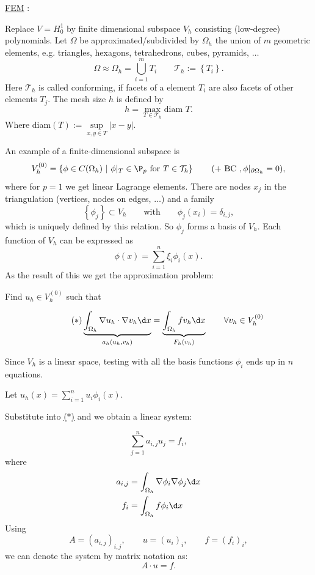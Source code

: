 \underline{FEM} :

Replace $V=H_{0}^{1}$ by finite dimensional subspace $V_{h}$ consisting (low-degree) polynomials.
Let $\Omega $ be approximated/subdivided by $\Omega _{h}$ the union of $m$ geometric elements, e.g. triangles, hexagons, tetrahedrons, cubes, pyramids, $\ldots $
\[
\Omega \approx \Omega _{h} = \bigcup_{i=1}^{m}T_{i} \qquad \mathcal{T}_{h} := \left\{ T_{i} \right\} 
.\] 
Here $\mathcal{T}_{h}$ is called conforming, if facets of a element $T_{i}$ are also facets of other elements $T_{j}$.
The mesh size $h$ is defined by
\[
h = \max\limits_{T \in\mathcal{T}_{h}} \text{diam } T
.\] 
Where diam$(T):=\underset{x,y \in T }{\sup} |x-y|$.

An example of a finite-dimensional subspace is
\[
	V_{h}^{(0)} = \left\{ \phi \in C(\Omega _{h})\ |\ \phi|_{T} \in \P_{p} \text{ for } T \in \mathcal{T}_{h} \right\} \qquad (+ \text{ BC }, \phi|_{\partial \Omega _{h}}=0)
,\] 
where for $p=1$ we get linear Lagrange elements.
There are nodes $x_{j}$ in the triangulation (vertices, nodes on edges, $\ldots $) and a family
\[
	\left\{ \phi_{j} \right\} \subset V_{h} \qquad \text{with}\qquad \phi_{j}(x_{i}) = \delta_{i,j}
,\] 
which is uniquely defined by this relation.
So $\phi_{j}$ forms a basis of $V_{h}$.
Each function of $V_{h}$ can be expressed as
\[
	\phi(x) = \sum_{i=1}^{n}{\xi _{i}\phi_{i}(x)}
.\] 
As the result of this we get the approximation problem:

Find $u_{h} \in V_{h}^{(0)}$ such that

\begin{equation}\label{eq:discreteproblem}\tag{$\ast$}
	\underbrace{\int_{\Omega _{h}}\nabla u_{h}\cdot \nabla v_{h} \d x}_{a_{h}(u_{h},v_{h})} 
	=
	\underbrace{\int_{\Omega _{h}}f v_{h} \d x}_{F_{h}(v_{h})}  \qquad \forall v_{h} \in V_{h}^{(0)}
\end{equation}

Since $V_{h}$ is a linear space, testing with all the basis functions $\phi _{i}$ ends up in $n$ equations.

Let $u_{h}(x) = \sum_{i=1}^{n}{u_{i}\phi _{i}(x)}$.

Substitute into \href{eq:discreteproblem}{($\ast$)} and we obtain a linear system:

\[
\sum_{j=1}^{n}{a_{i,j}u_{j}=f_{i}}
,\] 
where
\begin{align*}
	a_{i,j}&= \int_{\Omega _{h}}\nabla \phi _{i}\nabla \phi _{j} \d x \\
f_{i}&=\int_{\Omega _{h}}f \phi _{i} \d x
\end{align*}
Using
\[
	A = (a_{i,j})_{i,j}, \qquad u=(u_{i})_{i}, \qquad f=(f_{i})_{i}
,\] 
we can denote the system by matrix notation as:
\[
A \cdot u = f
.\] 


